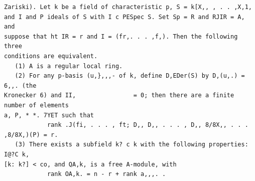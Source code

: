 \begin{theorem}\label{mcrt-auto-theorem-30-5}\uses{}
\begin{verbatim}
Zariski). Let k be a field of characteristic p, S = k[X,, , . . ,X,1,
and I and P ideals of S with I c PESpec S. Set Sp = R and RJIR = A, and
suppose that ht IR = r and I = (fr,. . . ,f,). Then the following three
conditions are equivalent.
   (1) A is a regular local ring.
   (2) For any p-basis (u,},,,- of k, define D,EDer(S) by D,(u,.) = 6,,. (the
Kronecker 6) and II,                = 0; then there are a finite number of elements
a, P, * *. 7YET such that
            rank .J(fi, . . . , ft; D,, D,, . . . , D,, 8/8X,, . . . ,8/8X,)(P) = r.
   (3) There exists a subfield k? c k with the following properties: I@?C k,
[k: k?] < co, and QA,k, is a free A-module, with
            rank OA,k. = n - r + rank a,,,. .
\end{verbatim}
\end{theorem}
